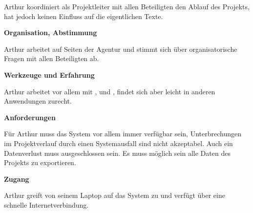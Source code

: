 \begin{multicols}{2}

\begin{center}
\end{center}


Arthur koordiniert als Projektleiter mit allen Beteiligten den Ablauf des Projekts, hat jedoch keinen Einfluss auf die eigentlichen Texte.

\textbf{Organisation, Abstimmung}

Arthur arbeitet auf Seiten der Agentur und stimmt sich über organisatorische Fragen mit allen Beteiligten ab.

\textbf{Werkzeuge und Erfahrung}

Arthur arbeitet vor allem mit ,  und , findet sich aber leicht in anderen Anwendungen zurecht.

\textbf{Anforderungen}

Für Arthur muss das System vor allem immer verfügbar sein, Unterbrechungen im Projektverlauf durch einen Systemausfall sind nicht akzeptabel. Auch ein Datenverlust muss ausgeschlossen sein. Es muss möglich sein alle Daten des Projekts zu exportieren.

\columnbreak

\textbf{Zugang}

Arthur greift von seinem Laptop auf das System zu und verfügt über eine schnelle Internetverbindung.


\end{multicols}
